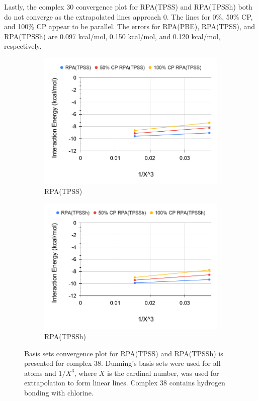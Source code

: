\documentclass[11pt]{article}
\begin{document}
Lastly, the complex 30 convergence plot for RPA(TPSS) and RPA(TPSSh) both
do not converge as the extrapolated lines approach 0. The lines for 0$\%$,
50$\%$ CP, and 100$\%$ CP appear to be parallel. The errors for RPA(PBE),
RPA(TPSS), and RPA(TPSSh) are 0.097 kcal/mol, 0.150 kcal/mol, and 0.120
kcal/mol, respectively.

\begin{figure}[hbpt]
  \centering
  \begin{subfigure}{.5\textwidth}
    \centering
    \includegraphics[scale=0.3]{tpss-38.png}
    \caption{RPA(TPSS)}
    \label{fig:tpss_38}
  \end{subfigure}%
  \begin{subfigure}{.5\textwidth}
    \centering
    \includegraphics[scale=0.3]{tpssh-38.png}
    \caption{RPA(TPSSh)}
    \label{fig:tpssh_38}
  \end{subfigure}
  \caption{Basis sets convergence plot for RPA(TPSS) and RPA(TPSSh) is
    presented for complex 38. Dunning's basis sets were used for all
    atoms and $1/X^3$, where $X$ is the cardinal number, was used for
    extrapolation to form linear lines. Complex 38 contains hydrogen
    bonding with chlorine.}
  \label{fig:complex_38}
\end{figure}
\end{document}
